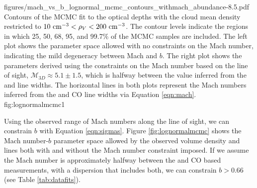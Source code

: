           {figures/mach_vs_b_lognormal_mcmc_contours_withmach_abundance-8.5.pdf}
{Contours of the MCMC fit to the \formaldehyde optical depths with the cloud
mean density restricted to $10~\textrm{cm}^{-3} < \rho_V < 200~\textrm{cm}^{-3}$.  The contour
levels indicate the regions in which 25, 50, 68, 95, and 99.7\% of the MCMC
samples are included. The left plot shows the parameter space allowed with no
constraints on the Mach number, indicating the mild degeneracy between Mach and
$b$.  The right plot shows the parameters derived using the constraints on the
Mach number based on the \north line of sight, $\mathcal{M}_{3D}\approx5.1\pm1.5$, which is
halfway between the value inferred from the \formaldehyde and \thirteenco line widths.  
The horizontal lines in both plots represent the Mach numbers inferred from the
\formaldehyde and CO line widths via Equation \ref{eqn:mach}.
}{fig:lognormalmcmc}{1}%

Using the observed range of Mach numbers along the \north line of sight, we can
constrain $b$ with Equation \ref{eqn:sigmas}.  Figure \ref{fig:lognormalmcmc} shows the Mach number-$b$
parameter space allowed by the observed volume density and \formaldehyde lines
both with and without the Mach number constraint imposed.  If we assume the Mach number
is approximately halfway between the \formaldehyde and CO based measurements, with
a dispersion that includes both, we can constrain $b>0.66$ (see Table \ref{tab:datafits}).


